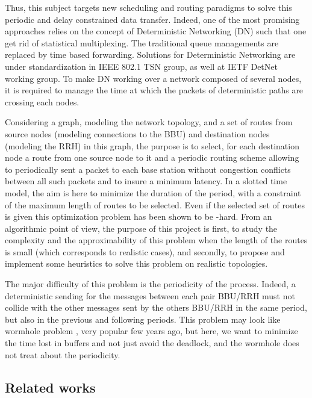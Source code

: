 \documentclass{article}
\begin{document}
 Thus, this subject targets new scheduling and routing paradigms to solve this periodic and delay constrained data transfer.
 Indeed, one of the most promising approaches relies on the concept of Deterministic Networking (DN) such that one get rid of
 statistical multiplexing. The traditional queue managements are replaced by time based forwarding. Solutions for Deterministic 
 Networking are under standardization in IEEE 802.1 TSN group, as well at IETF DetNet working group.  To make DN working over a
 network composed of several nodes, it is required to manage the time at which the packets of deterministic paths are crossing each nodes. 

Considering a graph, modeling the network topology, and a set of routes from source nodes (modeling connections to the BBU) and destination 
nodes (modeling the RRH) in this graph, the purpose is to select, for each destination node a route from one source node to it and a periodic 
routing scheme allowing to periodically sent a packet to each base station without congestion conflicts between all such packets and to insure a minimum latency. In a slotted time model, the aim is here to minimize the duration of the period, with a constraint of the maximum length of routes to be
selected. Even if the selected set of routes is given this optimization problem has been shown to be  \NP-hard. From an algorithmic point of view,
the purpose of this project is first, to study the complexity and the approximability of this problem when the length of the routes is small
(which corresponds to realistic cases), and secondly, to propose and implement some heuristics to solve this problem on realistic topologies.


The major difficulty of this problem is the periodicity of the process. Indeed, a deterministic sending for the messages
between each pair BBU/RRH must not collide with the other messages sent by the others BBU/RRH in the same period, but also in the previous
and following periods. This problem may look like wormhole problem \cite{cole1996benefit}, very popular few years ago, but here, we want to minimize the time lost in buffers and not just avoid the deadlock, and the wormhole does not treat about the periodicity.

\subsection*{Related works}
\end{document}
